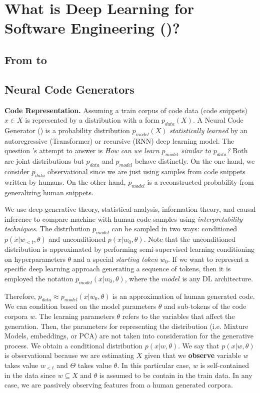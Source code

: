 \section{What is Deep Learning for Software Engineering \hfill \break (\dlse)?}
\label{sec:asofte}

\subsection{From \sw to \asw}

\subsection{Neural Code Generators}
\textbf{Code Representation.} Assuming a train corpus of code data (\eg code snippets) $x \in X$ is represented by a distribution with a form $p_{data}(X)$. A Neural Code Generator (\ncg) is a probability distribution $p_{model}(X)$ \textit{statistically learned} by an autoregressive (\ie Transformer) or recursive (\ie RNN) deep learning model. The question \ncg's attempt to answer is \textit{How can we learn $p_{model}$ similar to $p_{data}$?} Both are joint distributions but $p_{data}$ and $p_{model}$ behave distinctly. On the one hand, we consider $p_{data}$ observational since we are just using samples from code snippets written by humans. On the other hand, $p_{model}$ is a reconstructed probability from generalizing human snippets. 

We use deep generative theory, statistical analysis, information theory, and causal inference to compare machine with human code samples using \textit{interpretability techniques}. The distribution $p_{model}$ can be sampled in two ways: conditioned $p(x|w_{<t},\theta)$ and unconditioned  $p(x|w_0,\theta)$. Note that the unconditioned distribution is approximated by performing semi-supervised learning conditioning on hyperparameters $\theta$ and a special \textit{starting token} $w_0$. If we want to represent a specific deep learning approach generating a sequence of tokens, then it is employed the notation $p_{model}(x|w_0, \theta)$, where the $model$ is any DL architecture. 

Therefore, $p_{data} \approx p_{model}(x|w_0, \theta)$ is an approximation of human generated code. We can condition based on the model parameters $\theta$ and sub-tokens of the code corpora $w$. The learning parameters $\theta$ refers to the variables that affect the generation. Then, the parameters for representing the distribution (i.e. Mixture Models, embeddings, or PCA) are not taken into consideration for the generative process. We obtain a conditional distribution $p(x|w,\theta)$. We say that $p(x|w,\theta)$ is observational because we are estimating $X$ given that we \textbf{observe} variable $w$ takes value $w_{<t}$ and $\Theta$ takes value $\theta$. In this particular case, $w$ is self-contained in the data since $w \subseteq X$ and $\theta$ is assumed to be contain in the train data. In any case, we are passively observing features from a human generated corpora. 

